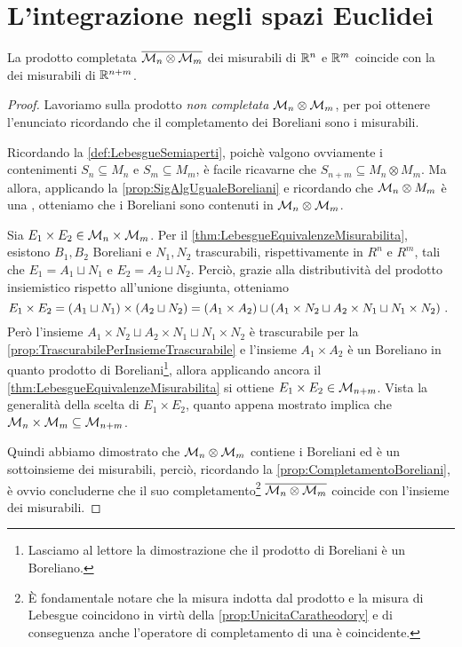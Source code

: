 \section{L'integrazione negli spazi Euclidei}


\begin{proposition}\label{prop:MisuraProdottoEuclidea}
	La \sigalg{} prodotto completata $\overline{\mathcal M_n\otimes\mathcal M_m}$ dei misurabili di $\mathbb R^n$ e $\mathbb R^m$ coincide con la \sigalg{} dei misurabili di $\mathbb R^{n+m}$.
\end{proposition}
\begin{proof}
	Lavoriamo sulla \sigalg{} prodotto \emph{non completata} $\mathcal M_n\otimes\mathcal M_m$, per poi ottenere l'enunciato ricordando che il completamento dei Boreliani sono i misurabili.

	Ricordando la \cref{def:LebesgueSemiaperti}, poichè valgono ovviamente i contenimenti $S_n\subseteq M_n$ e $S_m\subseteq M_m$, è facile ricavarne che $S_{n+m}\subseteq M_n\otimes M_m$.
	Ma allora, applicando la \cref{prop:SigAlgUgualeBoreliani} e ricordando che $\mathcal M_n\otimes M_m$ è una \sigalg{}, otteniamo che i Boreliani sono contenuti in $\mathcal M_n\otimes\mathcal M_m$.
	
	Sia $E_1\times E_2\in \mathcal M_n\times\mathcal M_m$. Per il \cref{thm:LebesgueEquivalenzeMisurabilita}, esistono $B_1,B_2$ Boreliani e $N_1,N_2$ trascurabili, rispettivamente in $R^n$ e $R^m$, tali che $E_1=A_1\sqcup N_1$ e $E_2=A_2\sqcup N_2$.
	Perciò, grazie alla distributività del prodotto insiemistico rispetto all'unione disgiunta, otteniamo
	\begin{equation*}
		E_1\times E_2=(A_1\sqcup N_1)\times(A_2\sqcup N_2)=\left(A_1\times A_2\right)\sqcup\left(A_1\times N_2\sqcup A_2\times N_1 \sqcup N_1\times N_2\right) \, \text{. }
	\end{equation*}
	Però l'insieme $A_1\times N_2\sqcup A_2\times N_1 \sqcup N_1\times N_2$ è trascurabile per la \cref{prop:TrascurabilePerInsiemeTrascurabile} e l'insieme $A_1\times A_2$ è un Boreliano in quanto prodotto di Boreliani\footnote{Lasciamo al lettore la dimostrazione che il prodotto di Boreliani è un Boreliano.}, allora applicando ancora il \cref{thm:LebesgueEquivalenzeMisurabilita} si ottiene $E_1\times E_2\in\mathcal M_{n+m}$.
	Vista la generalità della scelta di $E_1\times E_2$, quanto appena mostrato implica che $\mathcal M_n\times\mathcal M_m\subseteq \mathcal M_{n+m}$.
	
	Quindi abbiamo dimostrato che $\mathcal M_n\otimes\mathcal M_m$ contiene i Boreliani ed è un sottoinsieme dei misurabili, perciò, ricordando la \cref{prop:CompletamentoBoreliani}, è ovvio concluderne che il suo completamento\footnote{È fondamentale notare che la misura indotta dal prodotto e la misura di Lebesgue coincidono in virtù della \cref{prop:UnicitaCaratheodory} e di conseguenza anche l'operatore di completamento di una \sigalg{} è coincidente.} $\overline{\mathcal M_n\otimes\mathcal M_m}$ coincide con l'insieme dei misurabili.
\end{proof}


